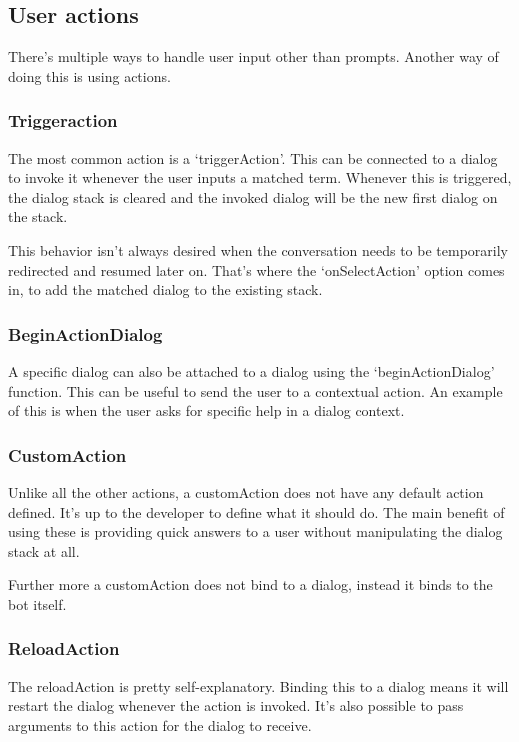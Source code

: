 \subsection{User actions}

There's multiple ways to handle user input other than prompts. Another way of doing this is using actions.

\subsubsection{Triggeraction}

The most common action is a `triggerAction'. This can be connected to a dialog to invoke it whenever the user inputs a matched term. Whenever this is triggered, the dialog stack is cleared and the invoked dialog will be the new first dialog on the stack.

This behavior isn't always desired when the conversation needs to be temporarily redirected and resumed later on. That's where the `onSelectAction' option comes in, to add the matched dialog to the existing stack.

\subsubsection{BeginActionDialog}

A specific dialog can also be attached to a dialog using the `beginActionDialog' function. This can be useful to send the user to a contextual action. An example of this is when the user asks for specific help in a dialog context.

\subsubsection{CustomAction}

Unlike all the other actions, a customAction does not have any default action defined. It's up to the developer to define what it should do. The main benefit of using these is providing quick answers to a user without manipulating the dialog stack at all.

Further more a customAction does not bind to a dialog, instead it binds to the bot itself.

\subsubsection{ReloadAction}

The reloadAction is pretty self-explanatory. Binding this to a dialog means it will restart the dialog whenever the action is invoked. It's also possible to pass arguments to this action for the dialog to receive.

